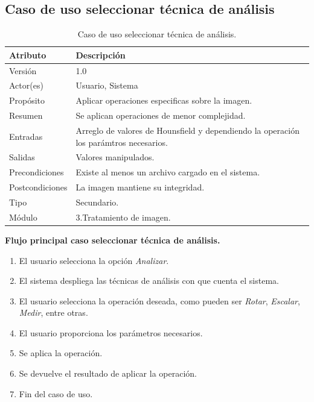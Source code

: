 \documentclass[12pt]{report}
\begin{document}
\subsection{Caso de uso seleccionar técnica de análisis}
\begin{table}[H]
\begin{center}
\begin{tabular}{p{30mm}p{80mm}}
\hline
Atributo & Descripción\\
\hline \hline 
Versión & 1.0\\
Actor(es) & Usuario, Sistema\\
Propósito & Aplicar operaciones especificas sobre la imagen.\\
Resumen & Se aplican operaciones de menor complejidad.\\
Entradas & Arreglo de valores de Hounsfield y dependiendo la operación los parámtros necesarios.\\
Salidas & Valores manipulados.\\
Precondiciones & Existe al menos un archivo cargado en el sistema.\\
Postcondiciones & La imagen mantiene su integridad.\\
Tipo & Secundario.\\
Módulo & 3.Tratamiento de imagen.\\
\hline \hline
\end{tabular}
\caption{Caso de uso seleccionar técnica de análisis.}
\end{center}
\end{table}

\textbf{Flujo principal caso seleccionar técnica de análisis. }
\begin{enumerate}
\item El usuario selecciona la opción \textit{Analizar}.
\item El sistema despliega las técnicas de análisis con que cuenta el sistema.
\item El usuario selecciona la operación deseada, como pueden ser \textit{Rotar}, \textit{Escalar}, \textit{Medir}, entre otras.
\item El usuario proporciona los parámetros necesarios.
\item Se aplica la operación.
\item Se devuelve el resultado de aplicar la operación.
\item Fin del caso de uso.
\end{enumerate}
\end{document}
